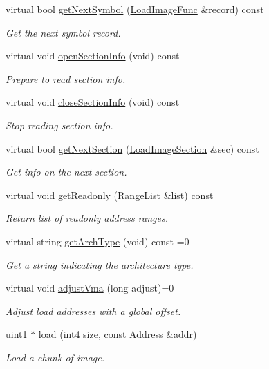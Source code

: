 \begin{DoxyCompactItemize}
virtual bool \mbox{\hyperlink{class_load_image_af4a887cf44c719c576bb05605a4c5c7e}{get\+Next\+Symbol}} (\mbox{\hyperlink{struct_load_image_func}{Load\+Image\+Func}} \&record) const
\begin{DoxyCompactList}\small\item\em Get the next symbol record. \end{DoxyCompactList}\item 
virtual void \mbox{\hyperlink{class_load_image_a915fb52632f5d770511833ed1cb76088}{open\+Section\+Info}} (void) const
\begin{DoxyCompactList}\small\item\em Prepare to read section info. \end{DoxyCompactList}\item 
virtual void \mbox{\hyperlink{class_load_image_a6358439b2aaef7497dad384b7c43213f}{close\+Section\+Info}} (void) const
\begin{DoxyCompactList}\small\item\em Stop reading section info. \end{DoxyCompactList}\item 
virtual bool \mbox{\hyperlink{class_load_image_ab4a927238becd33d8eb75ddc96cc9616}{get\+Next\+Section}} (\mbox{\hyperlink{struct_load_image_section}{Load\+Image\+Section}} \&sec) const
\begin{DoxyCompactList}\small\item\em Get info on the next section. \end{DoxyCompactList}\item 
virtual void \mbox{\hyperlink{class_load_image_a31dba7f0f819c97e68f868cc623e4054}{get\+Readonly}} (\mbox{\hyperlink{class_range_list}{Range\+List}} \&list) const
\begin{DoxyCompactList}\small\item\em Return list of {\itshape readonly} address ranges. \end{DoxyCompactList}\item 
virtual string \mbox{\hyperlink{class_load_image_a5103418147e95994f66e77746c0a0cfc}{get\+Arch\+Type}} (void) const =0
\begin{DoxyCompactList}\small\item\em Get a string indicating the architecture type. \end{DoxyCompactList}\item 
virtual void \mbox{\hyperlink{class_load_image_a51a254f705fba6f0e6524995acd5aaa7}{adjust\+Vma}} (long adjust)=0
\begin{DoxyCompactList}\small\item\em Adjust load addresses with a global offset. \end{DoxyCompactList}\item 
uint1 $\ast$ \mbox{\hyperlink{class_load_image_ae7aee28b81e5629d90bf104954a6835b}{load}} (int4 size, const \mbox{\hyperlink{class_address}{Address}} \&addr)
\begin{DoxyCompactList}\small\item\em Load a chunk of image. \end{DoxyCompactList}\end{DoxyCompactItemize}
